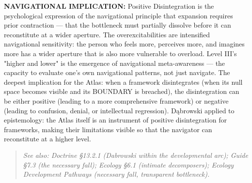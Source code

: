 \textbf{NAVIGATIONAL IMPLICATION:} Positive Disintegration is the psychological expression of the navigational principle that expansion requires prior contraction — that the bottleneck must partially dissolve before it can reconstitute at a wider aperture. The overexcitabilities are intensified navigational sensitivity: the person who feels more, perceives more, and imagines more has a wider aperture that is also more vulnerable to overload. Level III's "higher and lower" is the emergence of navigational meta-awareness — the capacity to evaluate one's own navigational patterns, not just navigate. The deepest implication for the Atlas: when a framework disintegrates (when its null space becomes visible and its BOUNDARY is breached), the disintegration can be either positive (leading to a more comprehensive framework) or negative (leading to confusion, denial, or intellectual regression). Dąbrowski applied to epistemology: the Atlas itself is an instrument of positive disintegration for frameworks, making their limitations visible so that the navigator can reconstitute at a higher level.


\begin{quote}
\itshape
\textit{See also: Doctrine §13.2.1 (Dabrowski within the developmental arc); Guide §7.3 (the necessary fall); Ecology §6.1 (intimate decomposers); Ecology Development Pathways (necessary fall, transparent bottleneck).}
\end{quote}


\bigskip\noindent\makebox[\textwidth]{\color{rulegray}\rule{5cm}{0.3pt}}\bigskip
